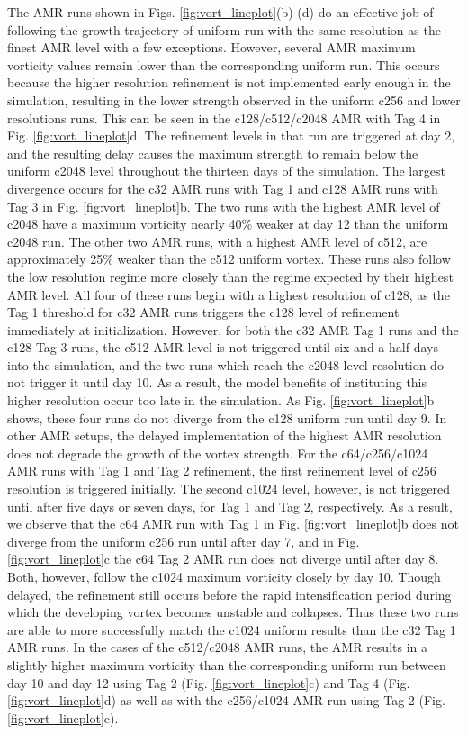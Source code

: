 \documentclass{ametsoc}
\begin{document}
The AMR runs shown in Figs. \ref{fig:vort_lineplot}(b)-(d) do an 
effective job of following the growth trajectory of uniform run with the same resolution as 
the finest AMR level with a few exceptions. 
However, several AMR maximum vorticity values remain lower than the corresponding uniform run.
This occurs because the higher resolution refinement is not implemented early enough in the simulation,
resulting in the lower strength observed in the uniform c256 and lower resolutions runs.
This can be seen in the c128/c512/c2048 AMR with Tag 4 in Fig. \ref{fig:vort_lineplot}d.
The refinement levels in that run are triggered at day 2, and the resulting delay
causes the maximum strength to remain below the uniform c2048 level throughout
the thirteen days of the simulation. The largest divergence occurs for the c32 AMR runs
with Tag 1 and c128 AMR runs with Tag 3 in Fig. \ref{fig:vort_lineplot}b. 
The two runs with the highest AMR level of c2048 have a maximum vorticity
nearly 40\% weaker at day 12 than the uniform c2048 run. The other two AMR runs, with a highest
AMR level of c512, are approximately 25\% weaker than the c512 uniform vortex. These runs also 
follow the low resolution regime more closely than the regime expected by their highest AMR level. 
All four of these runs begin with a highest resolution of c128, as the Tag 1 threshold for c32 AMR runs 
triggers the c128 level of refinement immediately at initialization.  However, for both the c32 AMR Tag 1 runs
and the c128 Tag 3 runs, the c512 AMR level is not triggered until six and a half days into the simulation,
and the two runs which reach the c2048 level resolution do not trigger it until day 10. As a result, the model benefits
of instituting this higher resolution occur too late in the simulation. As Fig. \ref{fig:vort_lineplot}b shows, these four
runs do not diverge from the c128 uniform run until
day 9. In other AMR setups, the delayed implementation of
the highest AMR resolution does not degrade the growth 
of the vortex strength. For the c64/c256/c1024 AMR 
runs with Tag 1 and Tag 2 refinement, the first refinement 
level of c256 resolution is triggered initially.
The second c1024 level, however, is not triggered until 
after five days or seven days, for Tag 1 and Tag 2, respectively.  
As a result, we observe that the c64 AMR run with Tag 1 in 
Fig. \ref{fig:vort_lineplot}b does not diverge from the uniform c256
run until after day 7, and in Fig. \ref{fig:vort_lineplot}c 
the c64 Tag 2 AMR run does not diverge until after day 8.
Both, however, follow the c1024 maximum vorticity closely by day 10.
Though delayed, the refinement still occurs before the rapid intensification period during which
the developing vortex becomes unstable and collapses. 
Thus these two runs are able to more successfully
match the c1024 uniform results than the c32 Tag 1 AMR 
runs. In the cases of the c512/c2048 AMR runs, the AMR results in a 
slightly higher maximum vorticity than the corresponding 
uniform run between day 10 and day 12 using 
Tag 2 (Fig. \ref{fig:vort_lineplot}c) and Tag 4 (Fig. \ref{fig:vort_lineplot}d)  
as well as with the c256/c1024 AMR run using Tag 2 (Fig. \ref{fig:vort_lineplot}c).
\end{document}
